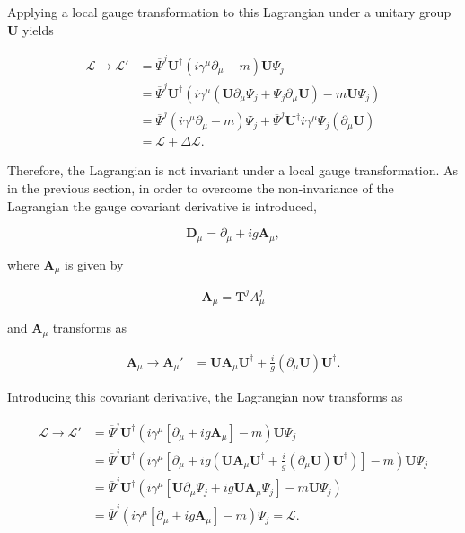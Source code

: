 \documentclass{article}
\begin{document}
Applying a local gauge transformation to this Lagrangian under a unitary group $\bm{U}$ yields

\begin{equation}
\label{eqn:localNonAbelianLagrangian}
\begin{split}
\mathcal{L}\rightarrow\mathcal{L'} & = \overline{\Psi}^j \bm{U}^\dagger (i\gamma^\mu \partial_\mu - m)\bm{U}\Psi_j \\
& = \overline{\Psi}^j \bm{U}^\dagger(i \gamma^\mu (\bm{U}\partial_\mu \Psi_j + \Psi_j \partial_\mu \bm{U}) - m\bm{U}\Psi_j) \\
& = \overline{\Psi}^j (i \gamma^\mu \partial_\mu - m)\Psi_j + \overline{\Psi}^j \bm{U}^\dagger i \gamma^\mu \Psi_j (\partial_\mu \bm{U}) \\
& = \mathcal{L} + \Delta \mathcal{L}.
\end{split}
\end{equation}

Therefore, the Lagrangian is not invariant under a local gauge transformation.
As in the previous section, in order to overcome the non-invariance of the Lagrangian the gauge covariant derivative is introduced,

\begin{equation}
\label{eqn:nonAbelianCovariantDeriative}
\bm{D}_\mu = \partial_\mu + i g \bm{A}_\mu,
\end{equation}

where $\bm{A}_\mu$ is given by 

\begin{equation}
\label{eqn:nonAbelianGaugeFieldDefinition}
\bm{A}_\mu = \bm{T}^j  A^{j}_\mu
\end{equation}

and $\bm{A}_\mu$ transforms as 

\begin{equation}
\label{eqn:nonAbelianGaugeFieldTransformation}
\begin{split}
\bm{A}_\mu \rightarrow \bm{A}_\mu' &= \bm{U}\bm{A}_\mu\bm{U}^\dagger + \frac{i}{g}(\partial_\mu \bm{U} )\bm{U}^\dagger.
\end{split}
\end{equation}

Introducing this covariant derivative, the Lagrangian now transforms as

\begin{equation}
\begin{split}
\mathcal{L}\rightarrow\mathcal{L'} &  = \overline{\Psi}^j \bm{U}^\dagger \left( i \gamma^\mu [\partial_\mu + ig\bm{A}_\mu] - m \right)\bm{U}\Psi_j \\
& = \overline{\Psi}^j \bm{U}^\dagger \left( i \gamma^\mu \left[\partial_\mu +ig\left(\bm{U}\bm{A}_\mu\bm{U}^\dagger + \frac{i}{g}(\partial_\mu \bm{U})\bm{U}^\dagger\right)\right] - m  \right)\bm{U}\Psi_j \\
& = \overline{\Psi}^j \bm{U}^\dagger \left( i \gamma^\mu \left[ \bm{U}\partial_\mu\Psi_j + ig\bm{U}\bm{A}_\mu\Psi_j \right] - m \bm{U}\Psi_j \right)\\
& = \overline{\Psi}^j \left( i \gamma^\mu \left[ \partial_\mu + ig\bm{A}_\mu \right] - m \right)\Psi_j = \mathcal{L}.
\end{split}
\end{equation}
\end{document}
